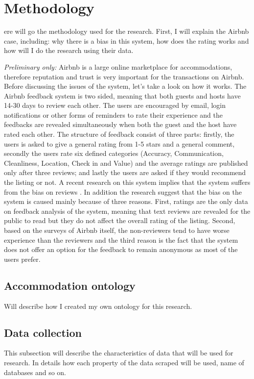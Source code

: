 %
%
\let\textcircled=\pgftextcircled
\chapter{Methodology}
\label{chap:methods}

ere will go the methodology used for the research. First, I will explain the Airbnb case, including: why there is a bias in this system, how does the rating works and how will I do the research using their data. 

\textit{Preliminary only:} Airbnb is a large online marketplace for accommodations, therefore reputation and trust is very important for the transactions on Airbnb. Before discussing the issues of the system, let’s take a look on how it works. The Airbnb feedback system is two sided, meaning that both guests and hosts have 14-30 days to review each other. The users are encouraged by email, login notifications or other forms of reminders to rate their experience and the feedbacks are revealed simultaneously when both the guest and the host have rated each other. The structure of feedback consist of three parts: firstly, the users is asked to give a general rating from 1-5 stars and a general comment, secondly the users rate six defined categories (Accuracy, Communication, Cleanliness, Location, Check in and Value) and the average ratings are published only after three reviews; and lastly the users are asked if they would recommend the listing or not. A recent research on this system implies that the system suffers from the bias on reviews \cite{fradkin2016bias}. In addition the research suggest that the bias on the system is caused mainly because of three reasons. First, ratings are the only data on feedback analysis of the system, meaning that text reviews are revealed for the public to read but they do not affect the overall rating of the listing. Second, based on the surveys of Airbnb itself, the non-reviewers tend to have worse experience than the reviewers and the third reason is the fact that the system does not offer an option for the feedback to remain anonymous as most of the users prefer.
\section{Accommodation ontology}
Will describe how I created my own ontology for this research.

\section{Data collection}
This subsection will describe the characteristics of data that will be used for research. In details how each property of the data scraped will be used, name of databases and so on.
